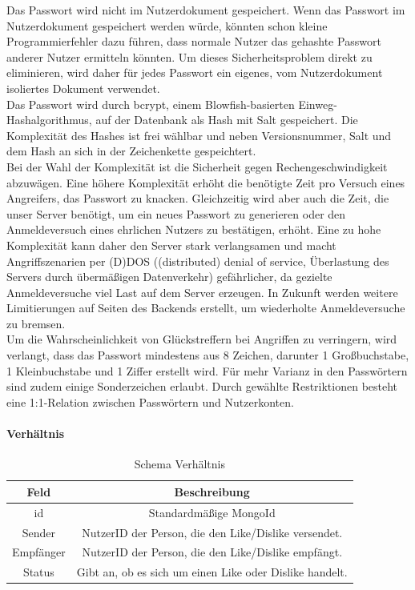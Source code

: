 Das Passwort wird nicht im Nutzerdokument gespeichert.
Wenn das Passwort im Nutzerdokument gespeichert werden würde, könnten schon kleine Programmierfehler dazu führen, dass normale Nutzer das gehashte Passwort anderer Nutzer ermitteln könnten.
Um dieses Sicherheitsproblem direkt zu eliminieren, wird daher für jedes Passwort ein eigenes, vom Nutzerdokument isoliertes Dokument verwendet.\\
Das Passwort wird durch bcrypt, einem Blowfish-basierten Einweg-Hashalgorithmus, auf der Datenbank als Hash mit Salt gespeichert.
Die Komplexität des Hashes ist frei wählbar und neben Versionsnummer, Salt und dem Hash an sich in der Zeichenkette gespeichtert.\cite{db:bcrypt}\\
Bei der Wahl der Komplexität ist die Sicherheit gegen Rechengeschwindigkeit abzuwägen.
Eine höhere Komplexität erhöht die benötigte Zeit pro Versuch eines Angreifers, das Passwort zu knacken.
Gleichzeitig wird aber auch die Zeit, die unser Server benötigt, um ein neues Passwort zu generieren oder den Anmeldeversuch eines ehrlichen Nutzers zu bestätigen, erhöht.
Eine zu hohe Komplexität kann daher den Server stark verlangsamen und macht Angriffszenarien per (D)DOS ((distributed) denial of service, Überlastung des Servers durch übermäßigen Datenverkehr) gefährlicher, da gezielte Anmeldeversuche viel Last auf dem Server erzeugen.
In Zukunft werden weitere Limitierungen auf Seiten des Backends erstellt, um wiederholte Anmeldeversuche zu bremsen.\\
Um die Wahrscheinlichkeit von Glückstreffern bei Angriffen zu verringern, wird verlangt, dass das Passwort mindestens aus 8 Zeichen, darunter 1 Großbuchstabe, 1 Kleinbuchstabe und 1 Ziffer erstellt wird.
Für mehr Varianz in den Passwörtern sind zudem einige Sonderzeichen erlaubt. %
Durch gewählte Restriktionen besteht eine 1:1-Relation zwischen Passwörtern und Nutzerkonten.

\paragraph{Verhältnis\\}
\begin{table}
    \centering
    \begin{tabular}{ |c|c| }
        \hline
        Feld & Beschreibung  \\
        \hline
        id & Standardmäßige MongoId \\
        Sender & NutzerID der Person, die den Like/Dislike versendet. \\
        Empfänger &  NutzerID der Person, die den Like/Dislike empfängt. \\
        Status & Gibt an, ob es sich um einen Like oder Dislike handelt. \\
        \hline
    \end{tabular}
    \caption{Schema Verhältnis}
    \label{db:table:like}
\end{table}

